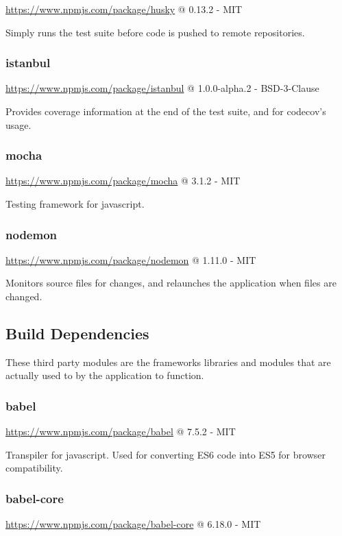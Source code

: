 \url{https://www.npmjs.com/package/husky} @ 0.13.2 - MIT

Simply runs the test suite before code is pushed to remote repositories.

\subsubsection*{istanbul} 

\url{https://www.npmjs.com/package/istanbul} @ 1.0.0-alpha.2 - BSD-3-Clause

Provides coverage information at the end of the test suite, and for codecov's usage.

\subsubsection*{mocha} 

\url{https://www.npmjs.com/package/mocha} @ 3.1.2 - MIT

Testing framework for javascript.

\subsubsection*{nodemon} 

\url{https://www.npmjs.com/package/nodemon} @ 1.11.0 - MIT

Monitors source files for changes, and relaunches the application when files are changed.

\subsection{Build Dependencies}
These third party modules are the frameworks libraries and modules that are actually used to by the application to function. 

\subsubsection*{babel}

\url{https://www.npmjs.com/package/babel} @ 7.5.2 - MIT

Transpiler for javascript. Used for converting ES6 code into ES5 for browser compatibility.

\subsubsection*{babel-core}

\url{https://www.npmjs.com/package/babel-core} @ 6.18.0 - MIT

